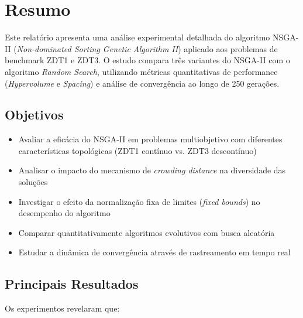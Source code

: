 
\section*{Resumo}

Este relatório apresenta uma análise experimental detalhada do algoritmo NSGA-II (\textit{Non-dominated Sorting Genetic Algorithm II}) aplicado aos problemas de benchmark ZDT1 e ZDT3. O estudo compara três variantes do NSGA-II com o algoritmo \textit{Random Search}, utilizando métricas quantitativas de performance (\textit{Hypervolume} e \textit{Spacing}) e análise de convergência ao longo de 250 gerações.

\subsection*{Objetivos}

\begin{itemize}
    \item Avaliar a eficácia do NSGA-II em problemas multiobjetivo com diferentes características topológicas (ZDT1 contínuo vs. ZDT3 descontínuo)
    \item Analisar o impacto do mecanismo de \textit{crowding distance} na diversidade das soluções
    \item Investigar o efeito da normalização fixa de limites (\textit{fixed bounds}) no desempenho do algoritmo
    \item Comparar quantitativamente algoritmos evolutivos com busca aleatória
    \item Estudar a dinâmica de convergência através de rastreamento em tempo real
\end{itemize}

\subsection*{Principais Resultados}

Os experimentos revelaram que:

